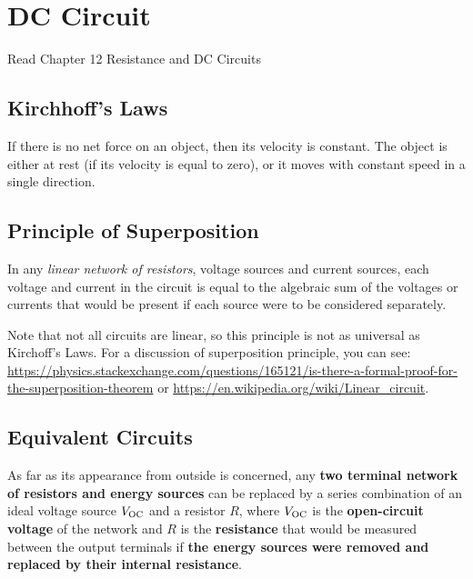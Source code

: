 \documentclass[a4paper,UTF8]{article}
\theoremstyle{mystyle}{
  \newtheorem{law}{Law}
}
\begin{document}
\section{DC Circuit}
{\sffamily Read Chapter 12 Resistance and DC Circuits}

\subsection{Kirchhoff's Laws}

\begin{law}
If there is no net force on an object, then its velocity is constant. The object is either at rest (if its velocity is equal to zero), or it moves with constant speed in a single direction.
\end{law}

\subsection{Principle of Superposition}
In any \emph{linear network of resistors}, voltage sources
and current sources, each voltage and current in the
circuit is equal to the algebraic sum of the voltages
or currents that would be present if each source
were to be considered separately.
\begin{remark}

Note that not all circuits are linear, so this principle is
not as universal as Kirchoff's Laws.
For a discussion of superposition principle, you can see:
\url{https://physics.stackexchange.com/questions/165121/is-there-a-formal-proof-for-the-superposition-theorem}
or \url{https://en.wikipedia.org/wiki/Linear_circuit}.
\end{remark}

\subsection{Equivalent Circuits}
\begin{theorem}
As far as its appearance from outside is concerned, any \textbf{two terminal
network of resistors and energy sources} can be replaced by a series
combination of an ideal voltage source $V_{\rm OC}$ and a resistor $R$, 
where $V_{\rm OC}$ is the
\textbf{open-circuit voltage} of the network and $R$ is the \textbf{resistance} that would be
measured between the output terminals if \textbf{the energy sources were
removed and replaced by their internal resistance}.
\end{theorem}
\end{document}
